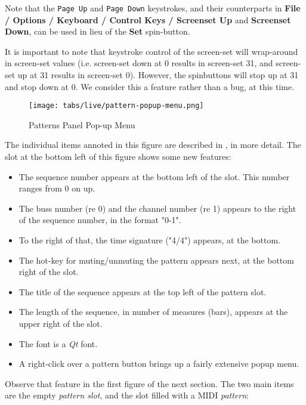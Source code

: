    Note that the \texttt{Page Up} and \texttt{Page Down} keystrokes, and their
   counterparts in
   \textbf{File / Options / Keyboard / Control Keys / Screenset Up}
   and \textbf{Screenset Down}, can be used in lieu of the
   \textbf{Set} spin-button.

   It is important to note that keystroke control of the screen-set will
   wrap-around in screen-set values (i.e. screen-set down at 0 results in
   screen-set 31, and screen-set up at 31 results in screen-set 0).
   However, the spinbuttons will stop up at 31 and stop down at 0.
   We consider this a feature rather than a bug, at this time.

\begin{figure}[H]
   \centering 
   \texttt{[image: tabs/live/pattern-popup-menu.png]}
   \caption{Patterns Panel Pop-up Menu}
   \label{fig:patterns_panel_popup_menu}
\end{figure}

   The individual items annoted in this figure are described in
   , in more detail.
   The slot at the bottom left of this figure shows some new features:

   \begin{itemize}
      \item The sequence number appears at the bottom left of the slot.
         This number ranges from 0 on up.
      \item The buss number (re 0) and the channel number (re 1) appears
         to the right of the sequence number, in the format "0-1".
      \item To the right of that, the time signature ("4/4") appears, at the
         bottom.
      \item The hot-key for muting/unmuting the pattern appears next,
         at the bottom right of the slot.
      \item The title of the sequence appears at the top left of the pattern
         slot.
      \item The length of the sequence, in number of measures (bars), appears
         at the upper right of the slot.
      \item The font is a \textsl{Qt} font.
      \item A right-click over a pattern button brings up a fairly extensive
         popup menu.
   \end{itemize}

   Observe that feature in the first figure of the next section.
   The two main items are the empty \textsl{pattern slot}, and the slot filled
   with a MIDI \textsl{pattern}:

